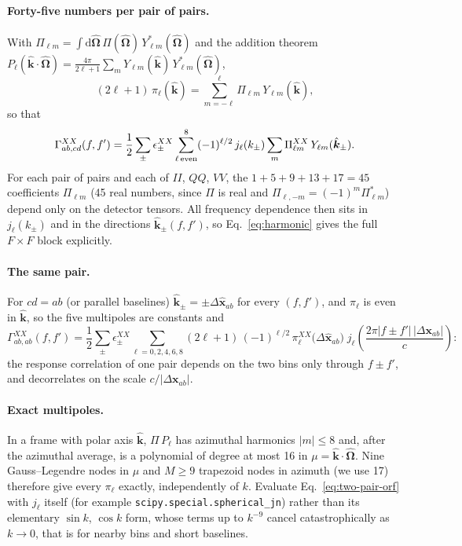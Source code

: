 \documentclass[11pt]{article}
\newcommand{\bOmega}{\hat{\bm{\Omega}}}
\theoremstyle{remark}
\begin{document}
\paragraph{Forty-five numbers per pair of pairs.}
With $\Pi_{\ell m} = \int \mathrm d\bOmega\, \Pi(\bOmega)\, Y^*_{\ell m}(\bOmega)$
and the addition theorem
$P_\ell(\hat{\bm k}\cdot\bOmega) = \frac{4\pi}{2\ell+1}\sum_m
Y_{\ell m}(\hat{\bm k})\,Y^*_{\ell m}(\bOmega)$,
\begin{equation}
  (2\ell+1)\,\pi_\ell(\hat{\bm k}) = \sum_{m=-\ell}^{\ell}
    \Pi_{\ell m}\, Y_{\ell m}(\hat{\bm k}),
\end{equation}
so that
\begin{equation}
  \Gamma^{XX}_{ab,cd}(f,f') = \frac12\sum_\pm \epsilon^{XX}_\pm
  \sum_{\ell\,\rm even}^{8} (-1)^{\ell/2}\, j_\ell(k_\pm)
  \sum_{m} \Pi^{XX}_{\ell m}\, Y_{\ell m}(\hat{\bm k}_\pm).
  \label{eq:harmonic}
\end{equation}
For each pair of pairs and each of $II$, $QQ$, $VV$, the
$1 + 5 + 9 + 13 + 17 = 45$ coefficients $\Pi_{\ell m}$ (45 real numbers, since
$\Pi$ is real and $\Pi_{\ell,-m} = (-1)^m\Pi^*_{\ell m}$) depend only on the
detector tensors. All frequency dependence then sits in $j_\ell(k_\pm)$ and in
the directions $\hat{\bm k}_\pm(f,f')$, so Eq.~\eqref{eq:harmonic} gives the
full $F\times F$ block explicitly.

\paragraph{The same pair.}
For $cd = ab$ (or parallel baselines) $\hat{\bm k}_\pm = \pm\Delta\hat{\bm x}_{ab}$
for every $(f,f')$, and $\pi_\ell$ is even in $\hat{\bm k}$, so the five
multipoles are constants and
\begin{equation}
  \Gamma^{XX}_{ab,ab}(f,f') = \frac12 \sum_\pm \epsilon^{XX}_\pm
  \sum_{\ell = 0,2,4,6,8} (2\ell+1)\,(-1)^{\ell/2}\,
  \pi^{XX}_\ell\big(\Delta\hat{\bm x}_{ab}\big)\;
  j_\ell\!\left(\frac{2\pi |f\pm f'|\,|\Delta\bm x_{ab}|}{c}\right):
\end{equation}
the response correlation of one pair depends on the two bins only through
$f\pm f'$, and decorrelates on the scale $c/|\Delta\bm x_{ab}|$.

\paragraph{Exact multipoles.}
In a frame with polar axis $\hat{\bm k}$, $\Pi\,P_\ell$ has azimuthal harmonics
$|m| \le 8$ and, after the azimuthal average, is a polynomial of degree at
most 16 in $\mu = \hat{\bm k}\cdot\bOmega$. Nine Gauss--Legendre nodes in $\mu$
and $M \ge 9$ trapezoid nodes in azimuth (we use 17) therefore give every
$\pi_\ell$ exactly, independently of $k$. Evaluate Eq.~\eqref{eq:two-pair-orf}
with $j_\ell$ itself (for example \texttt{scipy.special.spherical\_jn}) rather
than its elementary $\sin k$, $\cos k$ form, whose terms up to $k^{-9}$ cancel
catastrophically as $k \to 0$, that is for nearby bins and short baselines.
\end{document}
